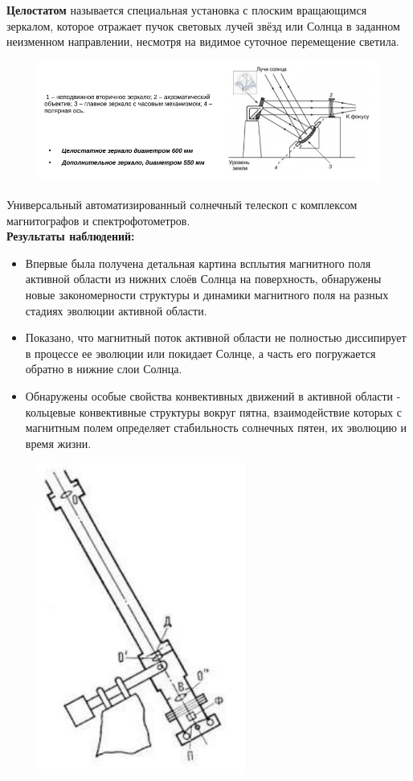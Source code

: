 \documentclass[12pt]{article}
\begin{document}
	\textbf{Целостатом} называется специальная установка с плоским вращающимся зеркалом, которое отражает пучок световых лучей звёзд или Солнца в заданном неизменном направлении, несмотря на видимое суточное перемещение светила.
	
\begin{figure}[h]
	\centering
	\includegraphics[width=0.9\linewidth]{"Снимок экрана от 2024-12-23 15-14-09"}
\end{figure}
	\newpage
	Универсальный автоматизированный солнечный телескоп с комплексом магнитографов и спектрофотометров.\\
	\textbf{Результаты наблюдений:}
	\begin{itemize}
	\item	Впервые была получена детальная картина всплытия магнитного поля активной области из
	нижних слоёв Солнца на поверхность, обнаружены новые закономерности структуры и
	динамики магнитного поля на разных стадиях эволюции активной области.
	\item Показано, что магнитный поток активной области не полностью диссипирует в процессе ее
	эволюции или покидает Солнце, а часть его погружается обратно в нижние слои Солнца.
	\item Обнаружены особые свойства конвективных движений в активной области - кольцевые
	конвективные структуры вокруг пятна, взаимодействие которых с магнитным полем определяет
	стабильность солнечных пятен, их эволюцию и время жизни.
	\end{itemize}
	\newpage
	
\begin{figure}[h]
	\centering
	\includegraphics[width=0.3\linewidth]{"Снимок экрана от 2024-12-23 15-21-34"}
\end{figure}
	
\end{document}
